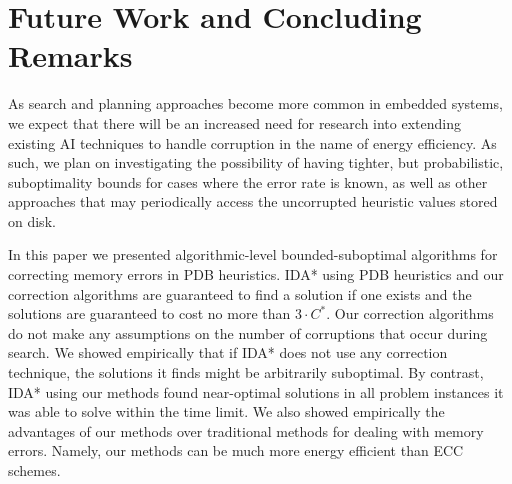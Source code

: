 \documentclass{article}
\begin{document}

\vspace{-0.15cm}
\section{Future Work and Concluding Remarks}

As search and planning approaches become more common in embedded
systems, we expect that there will be an increased need for research
into extending existing AI techniques to handle corruption in the name
of energy efficiency. As such, we plan on investigating the
possibility of having tighter, but probabilistic, suboptimality bounds
for cases where the error rate is known, as well as other
approaches that may periodically access the uncorrupted heuristic
values stored on disk.


In this paper we presented algorithmic-level bounded-suboptimal algorithms for correcting memory errors in PDB heuristics. %
IDA* using PDB heuristics and our correction algorithms are guaranteed to find a solution if one exists and the solutions are guaranteed to cost no more than $3 \cdot C^*$. Our correction algorithms do not make any assumptions on the number of corruptions that occur during search. We showed empirically that if IDA* does not use any correction technique, the solutions it finds might be arbitrarily suboptimal. %
By contrast, IDA* using our methods found near-optimal solutions in all problem instances it was able to solve within the time limit. We also showed empirically the advantages of our methods over traditional methods for dealing with memory errors. Namely, our methods can be much more energy efficient than ECC schemes. 



\newpage


\end{document}
